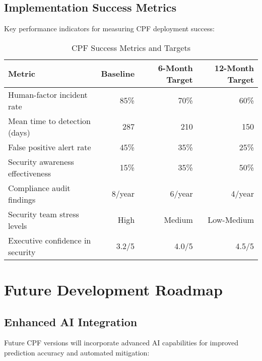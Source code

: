 \documentclass[10pt,twocolumn]{IEEEtran}
\begin{document}
\subsection{Implementation Success Metrics}

Key performance indicators for measuring CPF deployment success:

\begin{table}[h]
\centering
\caption{CPF Success Metrics and Targets}
\label{tab:success_metrics}
\begin{tabular}{@{}lrrr@{}}
\toprule
\textbf{Metric} & \textbf{Baseline} & \textbf{6-Month Target} & \textbf{12-Month Target} \\
\midrule
Human-factor incident rate & 85\% & 70\% & 60\% \\
Mean time to detection (days) & 287 & 210 & 150 \\
False positive alert rate & 45\% & 35\% & 25\% \\
Security awareness effectiveness & 15\% & 35\% & 50\% \\
Compliance audit findings & 8/year & 6/year & 4/year \\
Security team stress levels & High & Medium & Low-Medium \\
Executive confidence in security & 3.2/5 & 4.0/5 & 4.5/5 \\
\bottomrule
\end{tabular}
\end{table}

\section{Future Development Roadmap}

\subsection{Enhanced AI Integration}

Future CPF versions will incorporate advanced AI capabilities for improved prediction accuracy and automated mitigation:
\end{document}

